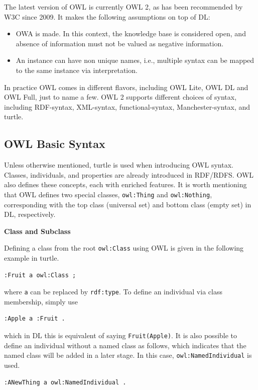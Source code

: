 The latest version of OWL is currently OWL 2, as has been recommended by W3C since 2009. It makes the following assumptions on top of DL:
\begin{itemize}
	\item OWA is made. In this context, the knowledge base is considered open, and absence of information must not be valued as negative information.
	\item An instance can have non unique names, i.e., multiple syntax can be mapped to the same instance via interpretation.
\end{itemize}
In practice OWL comes in different flavors, including OWL Lite, OWL DL and OWL Full, just to name a few. OWL 2 supports different choices of syntax, including RDF-syntax, XML-syntax, functional-syntax, Manchester-syntax, and turtle.

\subsection{OWL Basic Syntax}

Unless otherwise mentioned, turtle is used when introducing OWL syntax. Classes, individuals, and properties are already introduced in RDF/RDFS. OWL also defines these concepts, each with enriched features. It is worth mentioning that OWL defines two special classes, \verb|owl:Thing| and \verb|owl:Nothing|, corresponding with the top class (universal set) and bottom class (empty set) in DL, respectively.

\vspace{0.1in}
\noindent \textbf{Class and Subclass}
\vspace{0.1in}

Defining a class from the root \verb|owl:Class| using OWL is given in the following example in turtle.
\begin{lstlisting}
:Fruit a owl:Class ;
\end{lstlisting}
where \verb|a| can be replaced by \verb|rdf:type|. To define an individual via class membership, simply use
\begin{lstlisting}
:Apple a :Fruit .
\end{lstlisting}
which in DL this is equivalent of saying \verb|Fruit(Apple)|. It is also possible to define an individual without a named class as follows, which indicates that the named class will be added in a later stage. In this case, \verb|owl:NamedIndividual| is used.
\begin{lstlisting}
:ANewThing a owl:NamedIndividual .
\end{lstlisting}

